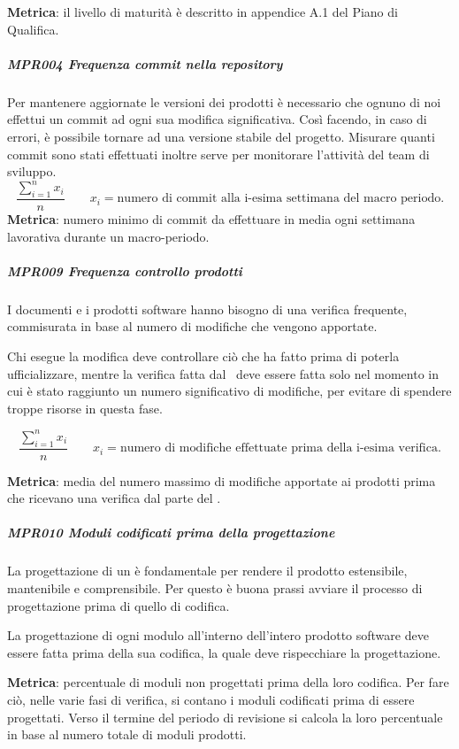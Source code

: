 	        \textbf{Metrica}: il livello di maturità è descritto in appendice A.1 del Piano di Qualifica.

			\subparagraph{MPR004 Frequenza commit nella repository}
			Per mantenere aggiornate le versioni dei prodotti è necessario che ognuno di noi effettui un commit ad ogni sua modifica significativa.
			Così facendo, in caso di errori, è possibile tornare ad una versione stabile del progetto.
			Misurare quanti commit sono stati effettuati inoltre serve per monitorare l'attività del team di sviluppo.
			\[\dfrac{\sum_{i=1}^{n} x_i}{n} \qquad x_i=\text{numero di commit alla i-esima settimana del macro periodo.}\]
			\textbf{Metrica}: numero minimo di commit da effettuare in media ogni settimana lavorativa durante un macro-periodo.


			\subparagraph{MPR009 Frequenza controllo prodotti}
			I documenti e i prodotti software hanno bisogno di una verifica frequente, commisurata in base al numero di modifiche che vengono apportate.

			Chi esegue la modifica deve controllare ciò che ha fatto prima di poterla ufficializzare, mentre la verifica fatta dal \Ver\ deve essere
			fatta solo nel momento in cui è stato raggiunto un numero significativo di modifiche, per evitare di spendere troppe risorse in questa fase.

			\[\dfrac{\sum_{i=1}^{n} x_i}{n} \qquad x_i=\text{numero di modifiche effettuate prima della i-esima verifica.}\]

			\textbf{Metrica}: media del numero massimo di modifiche apportate ai prodotti prima che ricevano una verifica dal parte del \Ver.

            \subparagraph{MPR010 Moduli codificati prima della progettazione}
            La progettazione di un  è fondamentale per rendere il prodotto estensibile, mantenibile e comprensibile. Per questo è buona prassi avviare il processo di progettazione prima di quello di codifica.

            La progettazione di ogni modulo all'interno dell'intero prodotto software deve essere fatta prima della sua codifica, la quale deve rispecchiare la progettazione.

            \textbf{Metrica}: percentuale di moduli non progettati prima della loro codifica. Per fare ciò, nelle varie fasi di verifica, si contano i moduli codificati prima di essere progettati. Verso il termine del periodo di revisione si calcola la loro percentuale in base al numero totale di moduli prodotti.

